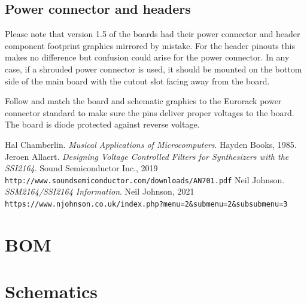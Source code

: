 \documentclass{article}
\begin{document}
\subsection{Power connector and headers}
Please note that version 1.5 of the boards had their power connector and header component footprint graphics mirrored by mistake. For the header pinouts this makes no difference but confusion could arise for the power connector. In any case, if a shrouded power connector is used, it should be mounted on the bottom side of the main board with the cutout slot facing away from the board.\newline

Follow and match the board and schematic graphics to the Eurorack power connector standard to make sure the pins deliver proper voltages to the board. The board is diode protected against reverse voltage.

\begin{thebibliography}{9}
Hal Chamberlin.
\textit{Musical Applications of Microcomputers}.
Hayden Books, 1985.
Jeroen Allaert.
\textit{Designing Voltage Controlled Filters for Synthesizers with the SSI2164}.
Sound Semiconductor Inc., 2019
\\\texttt{http://www.soundsemiconductor.com/downloads/AN701.pdf}
Neil Johnson.
\textit{SSM2164/SSI2164 Information}.
Neil Johnson, 2021
\\\texttt{https://www.njohnson.co.uk/index.php?menu=2\&submenu=2\&subsubmenu=3}
\end{thebibliography}

\newpage

\appendix

\section{BOM}

\centering
{}

\newpage


\section{Schematics}
\end{document}
